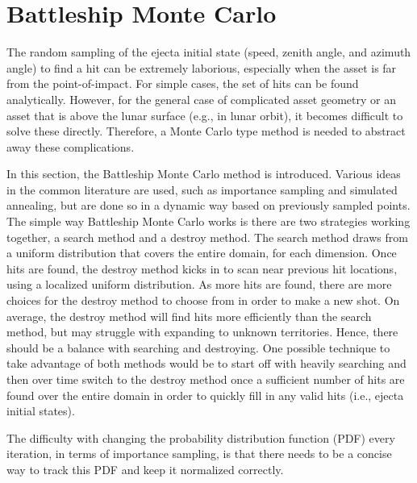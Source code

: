 \section{Battleship Monte Carlo}

The random sampling of the ejecta initial state (speed, zenith angle, and azimuth angle) to find a hit can be extremely laborious, especially when the asset is far from the point-of-impact. For simple cases, the set of hits can be found analytically. However, for the general case of complicated asset geometry or an asset that is above the lunar surface (e.g., in lunar orbit), it becomes difficult to solve these directly. Therefore, a Monte Carlo type method is needed to abstract away these complications.

In this section, the Battleship Monte Carlo method is introduced. Various ideas in the common literature are used, such as importance sampling and simulated annealing, but are done so in a dynamic way based on previously sampled points. The simple way Battleship Monte Carlo works is there are two strategies working together, a search method and a destroy method. The search method draws from a uniform distribution that covers the entire domain, for each dimension. Once hits are found, the destroy method kicks in to scan near previous hit locations, using a localized uniform distribution. As more hits are found, there are more choices for the destroy method to choose from in order to make a new shot. On average, the destroy method will find hits more efficiently than the search method, but may struggle with expanding to unknown territories. Hence, there should be a balance with searching and destroying. One possible technique to take advantage of both methods would be to start off with heavily searching and then over time switch to the destroy method once a sufficient number of hits are found over the entire domain in order to quickly fill in any valid hits (i.e., ejecta initial states).

The difficulty with changing the probability distribution function (PDF) every iteration, in terms of importance sampling, is that there needs to be a concise way to track this PDF and keep it normalized correctly.